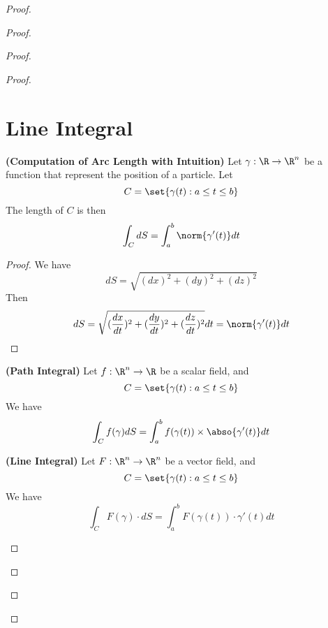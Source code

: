 \documentclass{report}
\begin{document}
\begin{proof}
\begin{proof}
\begin{proof}
\begin{proof}
\section{Line Integral}
\begin{theorem}
\label{9.1.1}
\textbf{(Computation of Arc Length with Intuition)} Let  $\gamma:\R\rightarrow \R^n$ be a function that represent the position of a particle. Let
\begin{equation}
C=\set{\gamma (t):a\leq t\leq b}
\end{equation}
The length of $C$ is then
 \begin{equation}
\int_C dS=\int_a^b  \norm{\gamma '(t)}dt
\end{equation}
\end{theorem}
\begin{proof}
We have
\begin{equation}
  dS=\sqrt{(dx)^2+(dy)^2+(dz)^2}
\end{equation}
Then 
\begin{equation}
dS=\sqrt{(\frac{dx}{dt})^2+(\frac{dy}{dt})^2+(\frac{dz}{dt})^2}dt=\norm{\gamma '(t)}dt
\end{equation}
\end{proof}
\begin{corollary}
\label{9.1.2}
\textbf{(Path Integral)} Let $f:\R^n\rightarrow \R$ be a scalar field, and 
\begin{equation}
C=\set{\gamma (t):a\leq t\leq b}
\end{equation}
We have
\begin{equation}
\int_C f(\gamma )dS=\int_a^b f(\gamma (t)) \times \abso{\gamma '(t)}dt
\end{equation}
\end{corollary}
\begin{corollary}
\label{9.1.3}
\textbf{(Line Integral)} Let $F:\R^n\rightarrow \R^n$ be a vector field, and
\begin{equation}
C=\set{\gamma (t):a\leq t\leq  b}
\end{equation}
We have
\begin{equation}
\int_C F(\gamma )\cdot dS =\int_a^b F(\gamma (t)) \cdot \gamma '(t)dt
\end{equation}
\end{corollary}
\end{proof}
\end{proof}
\end{proof}
\end{proof}
\end{document}
